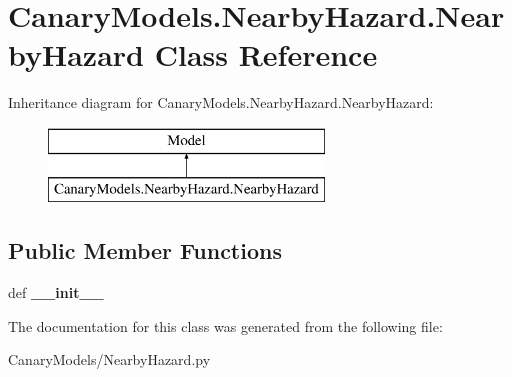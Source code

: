 \hypertarget{class_canary_models_1_1_nearby_hazard_1_1_nearby_hazard}{\section{Canary\-Models.\-Nearby\-Hazard.\-Nearby\-Hazard Class Reference}
\label{class_canary_models_1_1_nearby_hazard_1_1_nearby_hazard}
}
Inheritance diagram for Canary\-Models.\-Nearby\-Hazard.\-Nearby\-Hazard\-:\begin{figure}[H]
\begin{center}
\leavevmode
\includegraphics[height=2.000000cm]{class_canary_models_1_1_nearby_hazard_1_1_nearby_hazard}
\end{center}
\end{figure}
\subsection*{Public Member Functions}
\begin{DoxyCompactItemize}
\item 
\hypertarget{class_canary_models_1_1_nearby_hazard_1_1_nearby_hazard_ac9b77d72f77a5c5945e2064f21aaf334}{def {\bfseries \-\_\-\-\_\-init\-\_\-\-\_\-}}\label{class_canary_models_1_1_nearby_hazard_1_1_nearby_hazard_ac9b77d72f77a5c5945e2064f21aaf334}

\end{DoxyCompactItemize}


The documentation for this class was generated from the following file\-:\begin{DoxyCompactItemize}
\item 
Canary\-Models/Nearby\-Hazard.\-py\end{DoxyCompactItemize}
